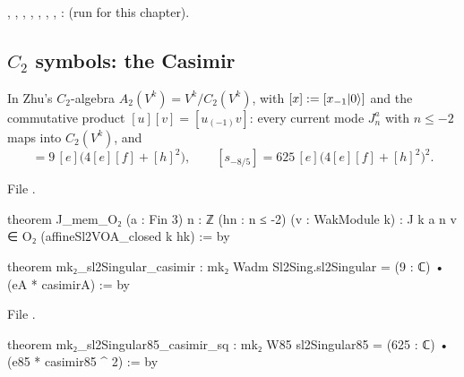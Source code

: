 \begin{status}
\allowbreak{}\allowbreak{}\allowbreak{}, \allowbreak{}\allowbreak{}\allowbreak{}\allowbreak{}\allowbreak{},
\allowbreak{}\allowbreak{}\allowbreak{}, \allowbreak{}\allowbreak{}\allowbreak{},
\allowbreak{}\allowbreak{}\allowbreak{}, \allowbreak{}\allowbreak{}\allowbreak{}\allowbreak{},
\allowbreak{}\allowbreak{}\allowbreak{}\allowbreak{}, \allowbreak{}\allowbreak{}\allowbreak{}\allowbreak{}: \lean{[propext,
Classical.}\allowbreak{}\allowbreak\lean{sound]} (run for this chapter).
\end{status}

\subsection{\texorpdfstring{$C_2$}{C2} symbols: the Casimir}

\begin{theorem}\label{l08:thm:symbol}
In Zhu's $C_2$-algebra $A_2(V^k) = V^k/C_2(V^k)$, with $[x] := [x_{-1}|0\rangle]$ and the commutative
product $[u][v] = [u_{(-1)}v]$: every current mode $J^a_n$ with $n\le-2$ maps into $C_2(V^k)$, and
\begin{equation*}
[s_{-4/3}] = 9\,[e]\bigl(4[e][f]+[h]^2\bigr),\qquad [s_{-8/5}] = 625\,[e]\bigl(4[e][f]+[h]^2\bigr)^2 .
\end{equation*}
\end{theorem}

\noindent File .
\begin{leancode}
theorem J_mem_O₂ (a : Fin 3) {n : ℤ} (hn : n ≤ -2) (v : WakModule k) :
    J k a n v ∈ O₂ (affineSl2VOA_closed k hk) := by

theorem mk₂_sl2Singular_casimir :
    mk₂ Wadm Sl2Sing.sl2Singular = (9 : ℂ) • (eA * casimirA) := by
\end{leancode}
\noindent File .
\begin{leancode}
theorem mk₂_sl2Singular85_casimir_sq :
    mk₂ W85 sl2Singular85 = (625 : ℂ) • (e85 * casimir85 ^ 2) := by
\end{leancode}

